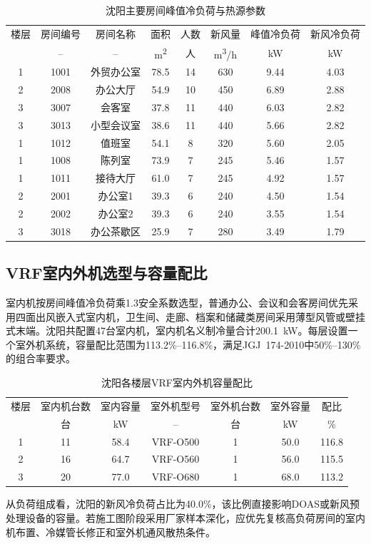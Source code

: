 \begin{table}[!htbp]
\centering
\caption{沈阳主要房间峰值冷负荷与热源参数}
\label{tab:shenyang-top-rooms}
\begin{tabular}{@{}cccccccc@{}}
\toprule
楼层 & 房间编号 & 房间名称 & 面积 & 人数 & 新风量 & 峰值冷负荷 & 新风冷负荷 \\
 & -- & -- & \si{m^2} & 人 & \si{m^3/h} & \si{kW} & \si{kW} \\
\midrule
1 & 1001 & 外贸办公室 & 78.5 & 14 & 630 & 9.44 & 4.03 \\
2 & 2008 & 办公大厅 & 54.9 & 10 & 450 & 6.89 & 2.88 \\
3 & 3007 & 会客室 & 37.8 & 11 & 440 & 6.03 & 2.82 \\
3 & 3013 & 小型会议室 & 38.6 & 11 & 440 & 5.66 & 2.82 \\
1 & 1012 & 值班室 & 54.1 & 8 & 320 & 5.60 & 2.05 \\
1 & 1008 & 陈列室 & 73.9 & 7 & 245 & 5.46 & 1.57 \\
1 & 1011 & 接待大厅 & 61.0 & 7 & 245 & 4.92 & 1.57 \\
2 & 2001 & 办公室1 & 39.3 & 6 & 240 & 4.50 & 1.54 \\
2 & 2002 & 办公室2 & 39.3 & 6 & 240 & 3.55 & 1.54 \\
3 & 3018 & 办公茶歇区 & 25.9 & 7 & 280 & 3.49 & 1.79 \\
\bottomrule
\end{tabular}
\end{table}

\subsection{VRF室内外机选型与容量配比}

室内机按房间峰值冷负荷乘1.3安全系数选型，普通办公、会议和会客房间优先采用四面出风嵌入式室内机，卫生间、走廊、档案和储藏类房间采用薄型风管或壁挂式末端。沈阳共配置47台室内机，室内机名义制冷量合计\SI{200.1}{kW}。每层设置一个室外机系统，容量配比范围为113.2\%--116.8\%，满足JGJ~174-2010中50\%--130\%的组合率要求。

\begin{table}[!htbp]
\centering
\caption{沈阳各楼层VRF室内外机容量配比}
\label{tab:shenyang-vrf-ratio}
\begin{tabular}{@{}ccccccc@{}}
\toprule
楼层 & 室内机台数 & 室内容量 & 室外机型号 & 室外机台数 & 室外容量 & 配比 \\
 & 台 & \si{kW} & -- & 台 & \si{kW} & \% \\
\midrule
1 & 11 & 58.4 & VRF-O500 & 1 & 50.0 & 116.8 \\
2 & 16 & 64.7 & VRF-O560 & 1 & 56.0 & 115.5 \\
3 & 20 & 77.0 & VRF-O680 & 1 & 68.0 & 113.2 \\
\bottomrule
\end{tabular}
\end{table}

从负荷组成看，沈阳的新风冷负荷占比为40.0\%，该比例直接影响DOAS或新风预处理设备的容量。若施工图阶段采用厂家样本深化，应优先复核高负荷房间的室内机布置、冷媒管长修正和室外机通风散热条件。
